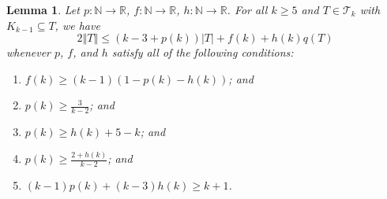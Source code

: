 \documentclass[12pt]{article}
\theoremstyle{plain}
\newtheorem{lem}[thm]{Lemma}
\theoremstyle{definition}
\theoremstyle{remark}
\newcommand{\fancy}[1]{\mathcal{#1}}
\newcommand{\IN}{\mathbb{N}}
\newcommand{\IR}{\mathbb{R}}
\newcommand{\T}{\fancy{T}}
\newcommand{\card}[1]{\left|#1\right|}
\newcommand{\size}[1]{\left\Vert#1\right\Vert}
\newcommand{\func}[3]{#1\colon #2 \rightarrow #3}
\begin{document}
\begin{lem}\label{BoundFamilyWithKKMinusOne}
	Let $\func{p}{\IN}{\IR}$, $\func{f}{\IN}{\IR}$, $\func{h}{\IN}{\IR}$. 
	For all $k \ge 5$ and $T \in \T_k$ with $K_{k-1} \subseteq T$, we have
	\[2\size{T} \le (k-3 + p(k))\card{T} + f(k) + h(k)q(T)\]
	whenever $p$, $f$, and $h$ satisfy all of the following conditions:
	\begin{enumerate}
		\item[(1)] $f(k) \ge (k-1)(1- p(k) - h(k))$; and	
	        \item[(2)] $p(k) \ge \frac{3}{k-2}$; and
		\item[(3)] $p(k) \ge h(k) + 5 - k$; and
		\item[(4)] $p(k) \ge \frac{2+h(k)}{k-2}$; and
		\item[(5)] $(k-1)p(k) + (k-3)h(k) \ge k+1$.
	\end{enumerate}
	
\end{lem}
\end{document}
